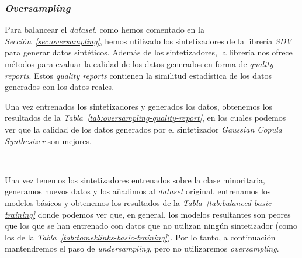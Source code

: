 \clearpage
\subsubsection{\textit{Oversampling}}

Para balancear el \textit{dataset}, como hemos comentado en la \textit{Sección\ \ref{sec:oversampling}}, hemos utilizado los sintetizadores de la librería \textit{SDV} para generar datos sintéticos. Además de los sintetizadores, la librería nos ofrece métodos para evaluar la calidad de los datos generados en forma de \textit{quality reports}. Estos \textit{quality reports} contienen la similitud estadística de los datos generados con los datos reales.

Una vez entrenados los sintetizadores y generados los datos, obtenemos los resultados de la \textit{Tabla\ \ref{tab:oversampling-quality-report}}, en los cuales podemos ver que la calidad de los datos generados por el sintetizador \textit{Gaussian Copula Synthesizer} son mejores.

\begin{table}[!h]
    \centering
    \caption{Resultados del \textit{quality report} de los datos generados con los sintetizadores. Fuente propia}\ \label{tab:oversampling-quality-report}
\end{table}

Una vez tenemos los sintetizadores entrenados sobre la clase minoritaria, generamos nuevos datos y los añadimos al \textit{dataset} original, entrenamos los modelos básicos y obtenemos los resultados de la \textit{Tabla\ \ref{tab:balanced-basic-training}} donde podemos ver que, en general, los modelos resultantes son peores que los que se han entrenado con datos que no utilizan ningún sintetizador (como los de la \textit{Tabla\ \ref{tab:tomeklinks-basic-training}}). Por lo tanto, a continuación mantendremos el paso de \textit{undersampling}, pero no utilizaremos \textit{oversampling}.

